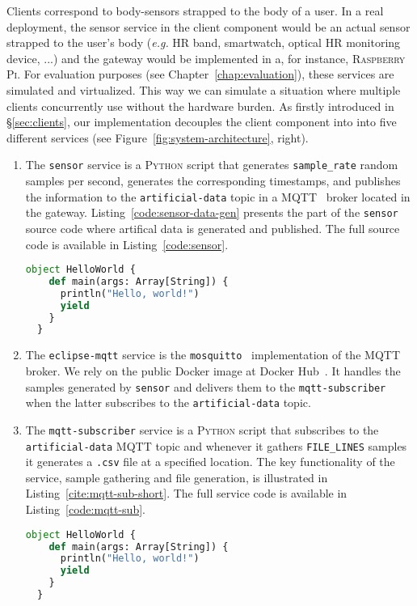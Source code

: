 Clients correspond to body-sensors strapped to the body of a user. 
In a real deployment, the sensor service in the client component would be an actual sensor strapped to the user's body (\textit{e.g.} HR band, smartwatch, optical HR monitoring device, ...) and the gateway would be implemented in a, for instance, \textsc{Raspberry Pi}.
For evaluation purposes (see Chapter~\ref{chap:evaluation}), these services are simulated and virtualized.
This way we can simulate a situation where multiple clients concurrently use \projName without the hardware burden.
As firstly introduced in \S\ref{sec:clients}, our implementation decouples the client component into into five different services (see Figure~\ref{fig:system-architecture}, right). 
\begin{enumerate}
    \item The \texttt{sensor} service is a \textsc{Python} script that generates \texttt{sample\_rate} random samples per second, generates the corresponding timestamps, and publishes the information to the \texttt{artificial-data} topic in a \textsc{MQTT}~\cite{mqtt-protocol} broker located in the gateway. Listing~\ref{code:sensor-data-gen} presents the part of the \texttt{sensor} source code where artifical data is generated and published. The full source code is available in Listing~\ref{code:sensor}.
\begin{lstlisting}[language=Python,caption={Snippet illustrating the artificial data generation in the \texttt{sensor} service.},label=code:sensor-data-gen]
 object HelloWorld {
    def main(args: Array[String]) {
      println("Hello, world!")
      yield
    }
  }
\end{lstlisting}
    \item The \texttt{eclipse-mqtt} service is the \texttt{mosquitto}~\cite{mqtt-eclipse} implementation of the \textsc{MQTT} broker. We rely on the public Docker image at Docker Hub~\cite{mqtt-image}. It handles the samples generated by \texttt{sensor} and delivers them to the \texttt{mqtt-subscriber} when the latter subscribes to the \texttt{artificial-data} topic.
    \item The \texttt{mqtt-subscriber} service is a \textsc{Python} script that subscribes to the \texttt{artificial-data} \textsc{MQTT} topic and whenever it gathers \texttt{FILE\_LINES} samples it generates a \texttt{.csv} file at a specified location. The key functionality of the service, sample gathering and file generation, is illustrated in Listing~\ref{cite:mqtt-sub-short}. The full service code is available in Listing~\ref{code:mqtt-sub}.
\begin{lstlisting}[language=Python,caption={Snippet illustrating the data gathering and file generation in the \texttt{mqtt-subscriber} service.},label=code:mqtt-sub-short]
 object HelloWorld {
    def main(args: Array[String]) {
      println("Hello, world!")
      yield
    }
  }
\end{lstlisting}
\end{enumerate}
